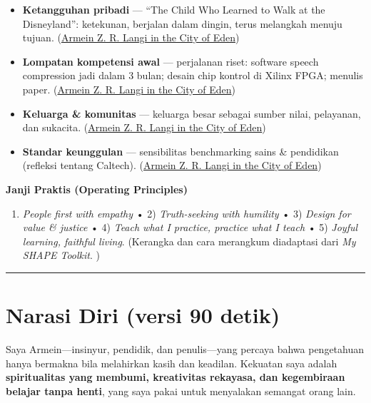 \documentclass[
  letterpaper,
  DIV=11,
  numbers=noendperiod]{scrreprt}
\providecommand{\tightlist}{%
  \setlength{\itemsep}{0pt}\setlength{\parskip}{0pt}}\usepackage{longtable,booktabs,array}
\begin{document}
\begin{itemize}
\tightlist
\item
  \textbf{Ketangguhan pribadi} --- ``The Child Who Learned to Walk at
  the Disneyland'': ketekunan, berjalan dalam dingin, terus melangkah
  menuju tujuan.
  (\href{https://ii-2100.github.io/all-about-me/My_Stories_for_You/index.html}{Armein
  Z. R. Langi in the City of Eden})
\item
  \textbf{Lompatan kompetensi awal} --- perjalanan riset: software
  speech compression jadi dalam 3 bulan; desain chip kontrol di Xilinx
  FPGA; menulis paper.
  (\href{https://ii-2100.github.io/all-about-me/My_Song_for_You/index.html}{Armein
  Z. R. Langi in the City of Eden})
\item
  \textbf{Keluarga \& komunitas} --- keluarga besar sebagai sumber
  nilai, pelayanan, dan sukacita.
  (\href{https://ii-2100.github.io/all-about-me/My_Shapes/index.html}{Armein
  Z. R. Langi in the City of Eden})
\item
  \textbf{Standar keunggulan} --- sensibilitas benchmarking sains \&
  pendidikan (refleksi tentang Caltech).
  (\href{https://ii-2100.github.io/all-about-me/My_Personal_Reviews/index.html}{Armein
  Z. R. Langi in the City of Eden})
\end{itemize}

\textbf{Janji Praktis (Operating Principles)}

\begin{enumerate}
\def\labelenumi{\arabic{enumi}.}
\tightlist
\item
  \emph{People first with empathy} • 2) \emph{Truth-seeking with
  humility} • 3) \emph{Design for value \& justice} • 4) \emph{Teach
  what I practice, practice what I teach} • 5) \emph{Joyful learning,
  faithful living}. (Kerangka dan cara merangkum diadaptasi dari
  \emph{My SHAPE Toolkit}. )
\end{enumerate}

\begin{center}\rule{0.5\linewidth}{0.5pt}\end{center}

\section{Narasi Diri (versi 90 detik)}\label{narasi-diri-versi-90-detik}

Saya Armein---insinyur, pendidik, dan penulis---yang percaya bahwa
pengetahuan hanya bermakna bila melahirkan kasih dan keadilan. Kekuatan
saya adalah \textbf{spiritualitas yang membumi, kreativitas rekayasa,
dan kegembiraan belajar tanpa henti}, yang saya pakai untuk menyalakan
semangat orang lain.
\end{document}
